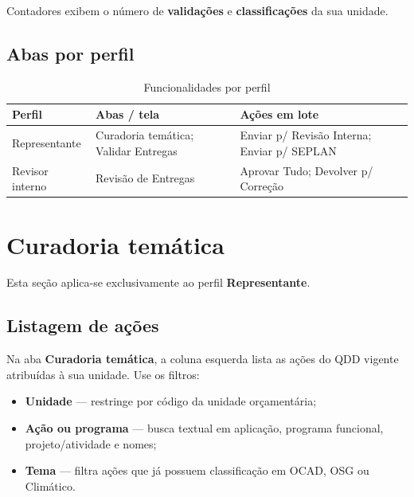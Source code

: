\documentclass[11pt,a4paper]{article}
\begin{document}
Contadores exibem o número de \textbf{validações} e \textbf{classificações} da sua unidade.

\subsection{Abas por perfil}

\begin{table}[htbp]
  \centering
  \guiaTableStretch
  \caption{Funcionalidades por perfil}
  \begin{tabularx}{\textwidth}{@{}L{3.2cm} Y Y@{}}
    \toprule
    \textbf{Perfil} & \textbf{Abas / tela} & \textbf{Ações em lote} \\
    \midrule
    Representante &
      Curadoria temática; Validar Entregas &
      Enviar p/ Revisão Interna; Enviar p/ SEPLAN \\
    Revisor interno &
      Revisão de Entregas &
      Aprovar Tudo; Devolver p/ Correção \\
    \bottomrule
  \end{tabularx}
\end{table}

\section{Curadoria temática}

\begin{boxrepresentante}
Esta seção aplica-se exclusivamente ao perfil \textbf{Representante}.
\end{boxrepresentante}

\subsection{Listagem de ações}

Na aba \textbf{Curadoria temática}, a coluna esquerda lista as ações do QDD vigente atribuídas à sua unidade. Use os filtros:

\begin{itemize}
  \item \textbf{Unidade} — restringe por código da unidade orçamentária;
  \item \textbf{Ação ou programa} — busca textual em aplicação, programa funcional, projeto/atividade e nomes;
  \item \textbf{Tema} — filtra ações que já possuem classificação em OCAD, OSG ou Climático.
\end{itemize}
\end{document}
